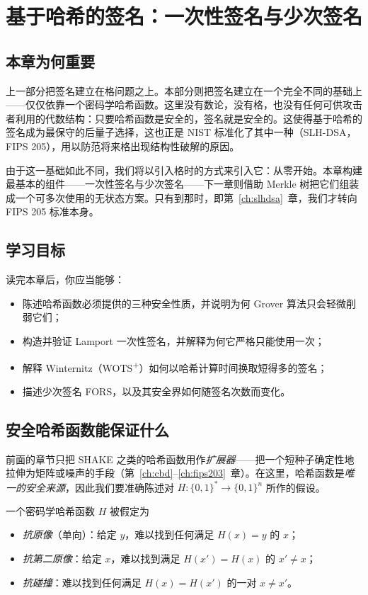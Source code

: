 \chapter{基于哈希的签名：一次性签名与少次签名}
\label{ch:hashots}

\section{本章为何重要}
上一部分把签名建立在格问题之上。本部分则把签名建立在一个完全不同的基础上——仅仅依靠一个密码学哈希函数。这里没有数论，没有格，也没有任何可供攻击者利用的代数结构：只要哈希函数是安全的，签名就是安全的。这使得基于哈希的签名成为最保守的后量子选择，这也正是 NIST 标准化了其中一种（SLH-DSA，FIPS 205），用以防范将来格出现结构性破解的原因。

由于这一基础如此不同，我们将以引入格时的方式来引入它：从零开始。本章构建最基本的组件——一次性签名与少次签名——下一章则借助 Merkle 树把它们组装成一个可多次使用的无状态方案。只有到那时，即第~\ref{ch:slhdsa}~章，我们才转向 FIPS 205 标准本身。

\section{学习目标}
读完本章后，你应当能够：

\begin{itemize}
  \item 陈述哈希函数必须提供的三种安全性质，并说明为何 Grover 算法只会轻微削弱它们；
  \item 构造并验证 Lamport 一次性签名，并解释为何它严格只能使用一次；
  \item 解释 Winternitz（WOTS\textsuperscript{+}）如何以哈希计算时间换取短得多的签名；
  \item 描述少次签名 FORS，以及其安全界如何随签名次数而变化。
\end{itemize}

\section{安全哈希函数能保证什么}
前面的章节只把 SHAKE 之类的哈希函数用作\emph{扩展器}——把一个短种子确定性地拉伸为矩阵或噪声的手段（第~\ref{ch:cbd}--\ref{ch:fips203}~章）。在这里，哈希函数是\emph{唯一的安全来源}，因此我们要准确陈述对 $H:\{0,1\}^*\to\{0,1\}^n$ 所作的假设。

\begin{definition}[哈希函数的安全性]
一个密码学哈希函数 $H$ 被假定为
\begin{itemize}
  \item \emph{抗原像}（单向）：给定 $y$，难以找到任何满足 $H(x)=y$ 的 $x$；
  \item \emph{抗第二原像}：给定 $x$，难以找到满足 $H(x')=H(x)$ 的 $x'\neq x$；
  \item \emph{抗碰撞}：难以找到任何满足 $H(x)=H(x')$ 的一对 $x\neq x'$。
\end{itemize}
\end{definition}

